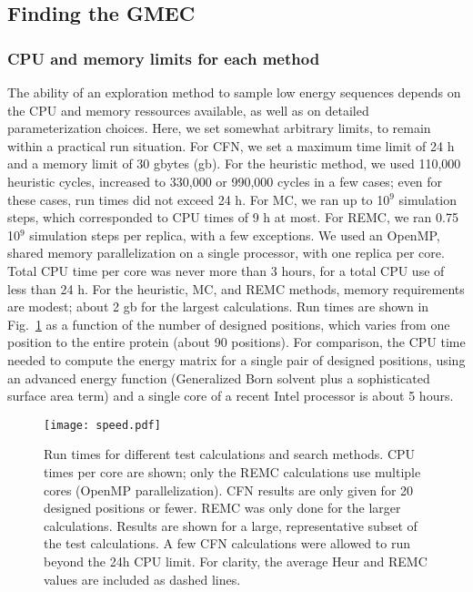 \subsection{Finding the GMEC}
\subsubsection{CPU and memory limits for each method}
\label{BESTprotocol}
The ability of an exploration method to sample low energy sequences depends on the CPU and memory ressources available, as well as on detailed parameterization choices. Here, we set somewhat arbitrary limits, to remain within a practical run situation. For CFN, we set a maximum time limit of 24 h and a memory limit of 30 gbytes (gb). For the heuristic method, we used 110,000 heuristic cycles, increased to 330,000 or 990,000 cycles in a few cases; even for these cases, run times did not exceed 24 h. For MC, we ran up to 10$^9$ simulation steps, which corresponded to CPU times of 9 h at most. For REMC, we ran 0.75 10$^9$ simulation steps per replica, with a few exceptions. We used an OpenMP, shared memory parallelization on a single processor, with one replica per core. Total CPU time per core was never more than 3 hours, for a total CPU use of less than 24 h. For the heuristic, MC, and REMC methods, memory requirements are modest; about 2 gb for the largest calculations. Run times are shown in Fig.\ \ref{fig:cpu} as a function of the number of designed positions, which varies from one position to the entire protein (about 90 positions). For comparison, the CPU time needed to compute the energy matrix for a single pair of designed positions, using an advanced energy function (Generalized Born solvent plus a sophisticated surface area term) and a single core of a recent Intel processor is about 5 hours.


    \begin{figure}[!htbp]
      \centering
        \texttt{[image: speed.pdf]} 
      \caption{
Run times for different test calculations and search methods. CPU times per core are shown; only the REMC calculations use multiple cores (OpenMP parallelization). CFN results are only given for 20 designed positions or fewer. REMC was only done for the larger calculations. Results are shown for a large, representative subset of the test calculations. A few CFN calculations were allowed to run beyond the 24h CPU limit. For clarity, the average Heur and REMC values are included as dashed lines.
      }
      
      \label{fig:cpu}
    \end{figure}


